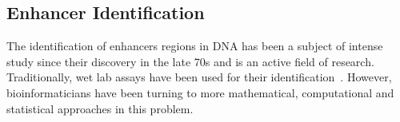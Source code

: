 
        


	

        


        
        \subsection{Enhancer Identification}
        
        The identification of enhancers regions in DNA has been a subject of intense study since their discovery in the late 70s and is an active field of research. Traditionally, wet lab assays have been used for their identification~\cite{rosenthal198772}. However, bioinformaticians have been turning to more mathematical, computational and statistical approaches in this problem. 
        
